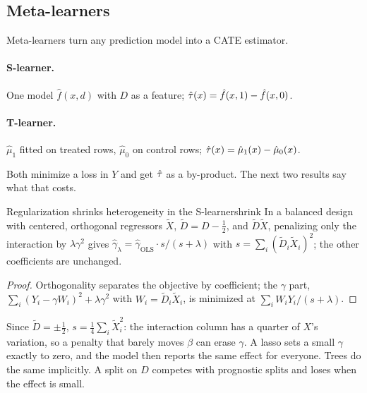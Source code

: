 \documentclass[11pt]{article}
\begin{document}
\subsection{Meta-learners}

Meta-learners turn any prediction model into a CATE estimator.

\paragraph{S-learner.} One model $\hat f(x, d)$ with $D$ as a feature; $\hat{\tau}(x) = \hat f(x,1) - \hat f(x,0)$.

\paragraph{T-learner.} $\hat\mu_1$ fitted on treated rows, $\hat\mu_0$ on control rows;
$\hat{\tau}(x) = \hat\mu_1(x) - \hat\mu_0(x)$.

Both minimize a loss in $Y$ and get $\hat{\tau}$ as a by-product. The next two results say what that costs.

\begin{prop}{Regularization shrinks heterogeneity in the S-learner}{shrink}
In a balanced design with centered, orthogonal regressors $\tilde X$, $\tilde D = D - \tfrac12$, and
$\tilde D\tilde X$, penalizing only the interaction by $\lambda\gamma^2$ gives
$\hat\gamma_\lambda = \hat\gamma_{\text{OLS}} \cdot s/(s + \lambda)$ with $s = \sum_i (\tilde D_i \tilde X_i)^2$; the other
coefficients are unchanged.
\end{prop}
\begin{proof}
Orthogonality separates the objective by coefficient; the $\gamma$ part, $\sum_i (Y_i - \gamma W_i)^2 + \lambda\gamma^2$
with $W_i = \tilde D_i\tilde X_i$, is minimized at $\sum_i W_iY_i/(s+\lambda)$.
\end{proof}
Since $\tilde D = \pm\tfrac12$, $s = \tfrac14\sum_i \tilde X_i^2$: the interaction column has a quarter of $X$'s
variation, so a penalty that barely moves $\beta$ can erase $\gamma$. A lasso sets a small $\gamma$ exactly to zero,
and the model then reports the same effect for everyone. Trees do the same implicitly. A split on $D$ competes
with prognostic splits and loses when the effect is small.
\end{document}
